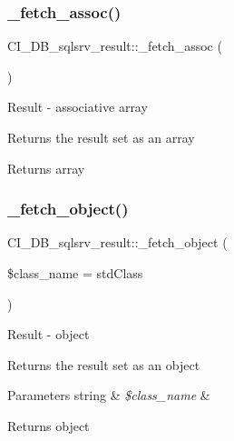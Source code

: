 \subsubsection{\texorpdfstring{\+\_\+fetch\+\_\+assoc()}{\_fetch\_assoc()}}
{\footnotesize\ttfamily C\+I\+\_\+\+D\+B\+\_\+sqlsrv\+\_\+result\+::\+\_\+fetch\+\_\+assoc (\begin{DoxyParamCaption}{ }\end{DoxyParamCaption})\hspace{0.3cm}{\ttfamily [protected]}}

Result -\/ associative array

Returns the result set as an array

\begin{DoxyReturn}{Returns}
array 
\end{DoxyReturn}
\mbox{\label{class_c_i___d_b__sqlsrv__result_a73f23dd4d5462f6510bf4721c9e6c4a2}} 
\subsubsection{\texorpdfstring{\+\_\+fetch\+\_\+object()}{\_fetch\_object()}}
{\footnotesize\ttfamily C\+I\+\_\+\+D\+B\+\_\+sqlsrv\+\_\+result\+::\+\_\+fetch\+\_\+object (\begin{DoxyParamCaption}\item[{}]{\$class\+\_\+name = {\ttfamily \textquotesingle{}stdClass\textquotesingle{}} }\end{DoxyParamCaption})\hspace{0.3cm}{\ttfamily [protected]}}

Result -\/ object

Returns the result set as an object


\begin{DoxyParams}[1]{Parameters}
string & {\em \$class\+\_\+name} & \\
\hline
\end{DoxyParams}
\begin{DoxyReturn}{Returns}
object 
\end{DoxyReturn}
\mbox{\label{class_c_i___d_b__sqlsrv__result_ad6bbd342d7176555a148738481822172}} 
